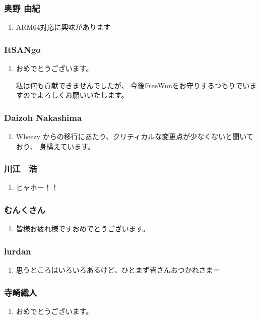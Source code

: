 \documentclass[cjk,dvipdfmx,10pt,compress,%
hyperref={bookmarks=true,bookmarksnumbered=true,bookmarksopen=false,%
colorlinks=false,%
pdftitle={第 97 回 関西 Debian 勉強会},%
pdfauthor={倉敷・のがた・佐々木・かわだ},%
pdfsubject={資料},%
}]{beamer}
\begin{document}
\begin{frame}
  \frametitle{ 奥野 由紀 }
  \begin{enumerate}
  \item ARM64対応に興味があります
  \end{enumerate}
\end{frame}

\begin{frame}
  \frametitle{ ItSANgo }
  \begin{enumerate}
  \item おめでとうございます。

    私は何も貢献できませんでしたが、 今後FreeWnnをお守りするつもりでいますのでよろしくお願いいたします。
  \end{enumerate}
\end{frame}

\begin{frame}
  \frametitle{ Daizoh Nakashima }
  \begin{enumerate}
  \item Wheezy からの移行にあたり、クリティカルな変更点が少なくないと聞いており、
    身構えています。
  \end{enumerate}
\end{frame}

\begin{frame}
  \frametitle{ 川江　浩 }
  \begin{enumerate}
  \item ヒャホー！！
  \end{enumerate}
\end{frame}

\begin{frame}
  \frametitle{ むんくさん }
  \begin{enumerate}
  \item 皆様お疲れ様ですおめでとうございます。
  \end{enumerate}
\end{frame}

\begin{frame}
  \frametitle{ lurdan }
  \begin{enumerate}
  \item 思うところはいろいろあるけど、ひとまず皆さんおつかれさまー
  \end{enumerate}
\end{frame}

\begin{frame}
  \frametitle{ 寺崎織人 }
  \begin{enumerate}
  \item おめでとうございます。
  \end{enumerate}
\end{frame}
\end{document}
